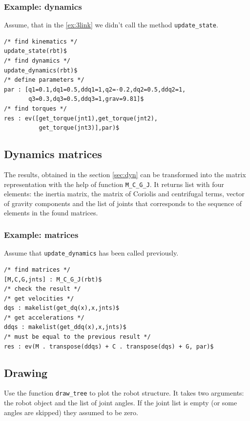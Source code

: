 \documentclass{article}
\begin{document}
\subsubsection{Example: dynamics} 

Assume, that in the \ref{ex:3link} we didn't call the method \texttt{update\_state}. 
\begin{verbatim}
/* find kinematics */
update_state(rbt)$
/* find dynamics */
update_dynamics(rbt)$
/* define parameters */
par : [q1=0.1,dq1=0.5,ddq1=1,q2=-0.2,dq2=0.5,ddq2=1,
       q3=0.3,dq3=0.5,ddq3=1,grav=9.81]$
/* find torques */
res : ev([get_torque(jnt1),get_torque(jnt2),
          get_torque(jnt3)],par)$
\end{verbatim}

\subsection{Dynamics matrices} 

The results, obtained in the section \ref{sec:dyn} can be transformed into the matrix representation with the help of function \texttt{M\_C\_G\_J}. It returns list with four elements: the inertia matrix, the matrix of Coriolis and centrifugal terms, vector of gravity components and the list of joints that corresponds to the sequence of elements in the found matrices. 

\subsubsection{Example: matrices} 

Assume that \texttt{update\_dynamics} has been called previously.
\begin{verbatim}
/* find matrices */
[M,C,G,jnts] : M_C_G_J(rbt)$
/* check the result */
/* get velocities */
dqs : makelist(get_dq(x),x,jnts)$
/* get accelerations */
ddqs : makelist(get_ddq(x),x,jnts)$
/* must be equal to the previous result */
res : ev(M . transpose(ddqs) + C . transpose(dqs) + G, par)$
\end{verbatim}

\subsection{Drawing}

Use the function \texttt{draw\_tree} to plot the robot structure. It takes two arguments: the robot object and the list of joint angles. If the joint list is empty (or some angles are skipped) they assumed to be zero. 
\end{document}
